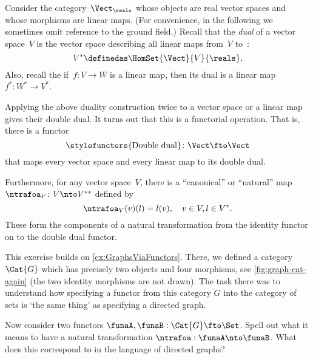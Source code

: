 \begin{example}\label{ex:Vect}
  Consider the category~$\Vect_{\reals}$ whose objects are real vector spaces and whose morphisms are linear maps. (For convenience, in the following we sometimes omit reference to the ground field.) Recall that the \emph{dual} of a vector space~$V$ is the vector space describing all linear maps from~$V$ to~\reals:
  \begin{equation}\label{eq:dual-vector-space}
    V^* \definedas \HomSet{\Vect}{V}{\reals},
  \end{equation}
  Also, recall the if~$f\colon V \to W$ is a linear map, then its dual is a linear map~$f^*\colon W^* \to V^*$.

  Applying the above duality construction twice to a vector space or a linear map gives their double dual. It turns out that this is a functorial operation. That is, there is a functor~
  \begin{equation}\label{eq:double-dual-functor}
      \text{\stylefunctors{Double dual}}\colon \Vect \fto \Vect
  \end{equation}
  that maps every vector space and every linear map to its double dual.

  Furthermore, for any vector space~$V$, there is a ``canonical'' or ``natural'' map~$\ntrafoa_V \colon V \nto V^{**}$ defined by
  \begin{equation}\label{eq:natural-trafo-to-double-dual}
    \ntrafoa_V(v)(l) = l(v), \quad  v \in V, l \in V^*.
  \end{equation}
  These form the components of a natural transformation from the identity functor on \Vect to the double dual functor.
  \begin{center}
  \end{center}
\end{example}



\begin{gradedexercise}\label{ex:NatTrafosGraphs}
This exercise builds on \cref{ex:GraphsViaFunctors}. There, we defined a category $\Cat{G}$ which has precisely two objects and four morphisms, see \cref{fig:graph-cat-again} (the two identity morphisms are not drawn). The task there was to understand how specifying a functor from this category $G$ into the category of sets is `the same thing' as specifying a directed graph. 

Now consider two functors $\funaA, \funaB : \Cat{G} \fto \Set$. Spell out what it means to have a natural transformation $\ntrafoa: \funaA \nto \funaB$. What does this correspond to in the language of directed graphs? 
\end{gradedexercise}

